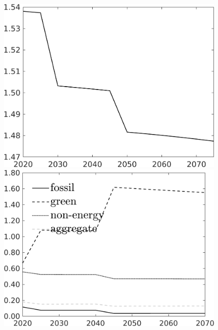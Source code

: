 \begin{figure}[h!!]
\begin{minipage}[]{0.32\textwidth}
	\end{minipage}
	\begin{minipage}[]{0.32\textwidth}
		\includegraphics[width=1\textwidth]{../../codding_model/own_basedOnFried/optimalPol_elastS_DisuSci/figures/all_1705/Single_OPT_T_NoTaus_hhhl_spillover0_sep1_BN0_ineq0_red0_etaa0.79.png}
	\end{minipage}
	\begin{minipage}[]{0.32\textwidth}
		\includegraphics[width=1\textwidth]{../../codding_model/own_basedOnFried/optimalPol_elastS_DisuSci/figures/all_1705/SingleJointTOT_OPT_T_NoTaus_Growth_spillover0_sep1_BN0_ineq0_red0_etaa0.79_lgd1.png}

\end{minipage}
\end{figure}
